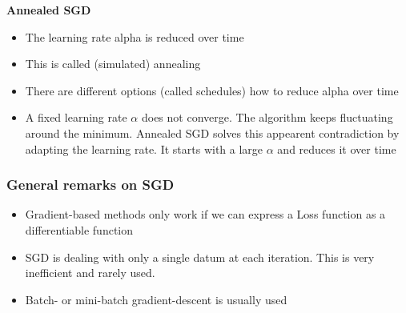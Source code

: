 \textbf{Annealed SGD}
\begin{itemize}
    \item The learning rate alpha is reduced over time
    \item This is called (simulated) annealing
    \item There are different options (called schedules) how to reduce alpha over time
    \item A fixed learning rate $\alpha$ does not converge. The algorithm keeps fluctuating around the minimum. Annealed SGD solves this appearent contradiction by adapting the learning rate. It starts with a large $\alpha$ and reduces it over time
\end{itemize}

\subsubsection{General remarks on SGD}
\begin{itemize}
    \item Gradient-based methods only work if we can express a Loss function as a differentiable function
    \item SGD is dealing with only a single datum at each iteration. This is very inefficient and rarely used.
    \item Batch- or mini-batch gradient-descent is usually used
\end{itemize}
